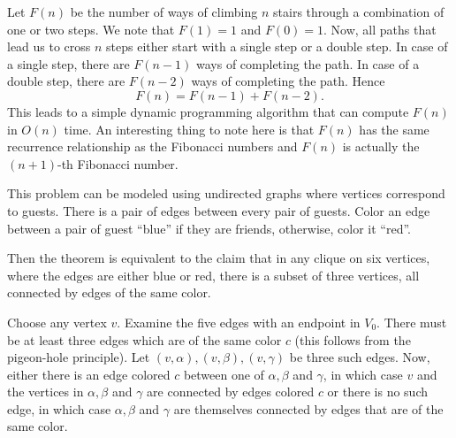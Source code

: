 \begin{comment}
Let $S(k)$ denote the number of ways of climbing a
staircase with $k$ steps.
Note that $S(0) = 1$ and $S(1) = 1$.
There are two choices for the final step---either take two steps or one step; both
yield different jump sequences.
Therefore $S$ satisfies the following recurrence:
\begin{eqnarray*}
S(k) & = & S(k-1) + S(k-2), \;\;\mbox{if} \; k > 1.
\end{eqnarray*}
The solution to this is the Fibonacci sequence.
\end{comment}
Let $F(n)$ be the number of ways of climbing $n$ stairs through a
combination of one or two steps.  We note that $F(1) = 1$ and $F(0) =
1$.
Now, all paths that lead us to cross $n$ steps either start with a
single step or a double step. In case of a single step, there are
$F(n-1)$ ways of completing the path. In case of a double step, there
are $F(n-2)$ ways of completing the path. Hence
\[ F(n) = F(n-1) + F(n-2) . \]
This leads to a simple dynamic programming algorithm that can compute
$F(n)$ in $O(n)$ time. An interesting thing to note 
here is that $F(n)$ has the same recurrence relationship as the Fibonacci
numbers and $F(n)$ is actually the $(n +1)$-th Fibonacci number.

This problem can be modeled using undirected graphs where vertices correspond to guests.
There is a pair of edges between every pair of guests.  Color an edge between a pair of guest ``blue''
if they are friends, otherwise, color it ``red''.

Then the theorem is equivalent to the claim
that in any clique on six vertices, where the edges are either blue or red, there is a subset of
three vertices, all connected by edges of the same color.


Choose any vertex $v$.  Examine the five edges with an endpoint
in $V_0$.  There must be at least three edges which are of the same color $c$
(this follows from the pigeon-hole principle).  Let $(v,\alpha), (v,\beta), (v,\gamma)$ be three such edges. Now, either there is an edge colored $c$
between one of $\alpha,\beta$ and $\gamma$, in which case $v$ and the vertices in $\alpha,\beta$ and $\gamma$
are connected by edges colored $c$ or there is no such edge, in which case $\alpha,\beta$ and $\gamma$ are
themselves connected by edges that are of the same color.


